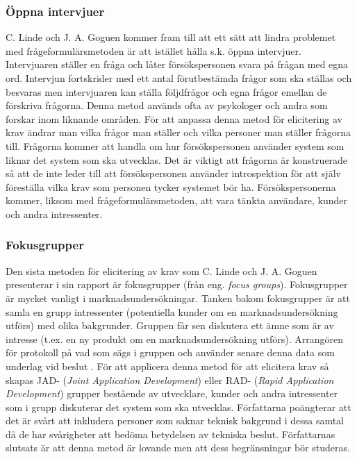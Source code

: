 \subsubsection{Öppna intervjuer} 
 C. Linde och J. A. Goguen kommer fram till att ett sätt att lindra problemet med frågeformulärsmetoden är att istället hålla s.k. öppna intervjuer. Intervjuaren ställer en fråga och låter försökspersonen svara på frågan med egna ord. Intervjun fortskrider med ett antal förutbestämda frågor som ska ställas och besvaras men intervjuaren kan ställa följdfrågor och egna frågor emellan de förskriva frågorna. Denna metod används ofta av psykologer och andra som forskar inom liknande områden. För att anpassa denna metod för elicitering av krav ändrar man vilka frågor man ställer och vilka personer man ställer frågorna till. Frågorna kommer att handla om hur försökspersonen använder system som liknar det system som ska utvecklas. Det är viktigt att frågorna är konstruerade så att de inte leder till att försökspersonen använder introspektion för att själv föreställa vilka krav som personen tycker systemet bör ha. Försökspersonerna kommer, liksom med frågeformulärsmetoden, att vara tänkta användare, kunder och andra intressenter. 

\subsubsection{Fokusgrupper}
Den sista metoden för elicitering av krav som C. Linde och J. A. Goguen presenterar i sin rapport är fokusgrupper (från eng. \textit{focus groups}). Fokusgrupper är mycket vanligt i marknadsundersökningar. Tanken bakom fokusgrupper är att samla en grupp intressenter (potentiella kunder om en marknadsundersökning utförs) med olika bakgrunder. Gruppen får sen diskutera ett ämne som är av intresse (t.ex. en ny produkt om en marknadsundersökning utförs). Arrangören för protokoll på vad som sägs i gruppen och använder senare denna data som underlag vid beslut \cite{hylander1998fokusgrupper}. För att applicera denna metod för att elicitera krav så skapas JAD- (\textit{Joint Application Development}) eller RAD- (\textit{Rapid Application Development}) grupper bestående av utvecklare, kunder och andra intressenter som i grupp diskuterar det system som ska utvecklas. Författarna poängterar att det är svårt att inkludera personer som saknar teknisk bakgrund i dessa samtal då de har svårigheter att bedöma betydelsen av tekniska beslut. Författarnas slutsats är att denna metod är lovande men att dess begränsningar bör studeras. 


